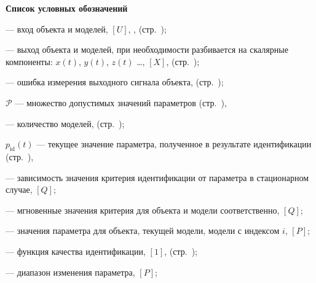 \clearpage
{}

\begin{center}
  \textbf{Список условных обозначений}
\end{center}


\begin{description}

  \item[$u(t)$]  --- вход объекта и моделей, $[U]$, , (стр.~\pageref{atu:d:u});

  \item[$\mathbf{x}(t)$]  --- выход объекта и моделей, при необходимости разбивается на скалярные компоненты:
    $x(t)$, $y(t)$, $z(t)$ \ldots, $[X]$, (стр.~\pageref{atu:d:x});

  \item[$w(t)$]  --- ошибка измерения выходного сигнала объекта, (стр.~\pageref{atu:d:w});

  \item{$\mathcal{P}$} --- множество допустимых значений параметров (стр.~\pageref{atu:d:p_set}),

  \item[$N$]  --- количество моделей, (стр.~\pageref{atu:d:N});

  \item{$p_\mathrm{id}(t)$ } --- текущее значение параметра, полученное в результате идентификации (стр.~\pageref{atu:d:p_id}),

  \item[$q(p)$]  --- зависимость значения критерия идентификации от параметра в стационарном случае, $[Q]$;

  \item[$q_o(t)$, $q_m(t)$]  --- мгновенные значения критерия для объекта и модели соответственно, $[Q]$;

  \item[$p_o(t)$, $p_m(t)$, $p_{mi}(t)$]  --- значения параметра для объекта, текущей модели, модели с индексом $i$, $[P]$;

  \item[$F(q_o,q_m) $]  --- функция качества идентификации, $[1]$, (стр.~\pageref{atu:d:F});

  \item[$\Delta p$]  --- диапазон изменения параметра, $[P]$;


\end{description}
